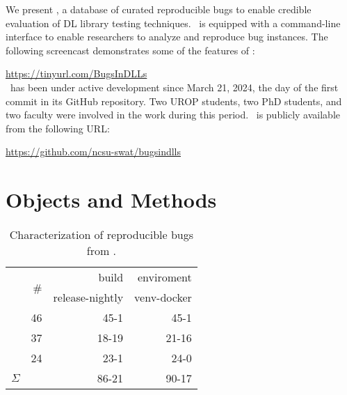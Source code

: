 \documentclass[sigconf,screen]{acmart}
\begin{document}
We present \tname, a database of curated reproducible bugs to
enable credible evaluation of DL library testing techniques. \tname\ is
equipped with a command-line interface to enable researchers to analyze
and reproduce bug instances. The following screencast demonstrates some
of the features of \tname:

\url{https://tinyurl.com/BugsInDLLs}\\

\tname\ has been under active development since March 21, 2024, the
day of the first commit in its GitHub repository. Two UROP students,
two PhD students, and two faculty were involved in the work during
this period. \tname\ is publicly available from the following URL:

\url{https://github.com/ncsu-swat/bugsindlls}


\section{Objects and Methods}

\begin{table}
  \centering
  \caption{\label{table:bug-characterization}Characterization of
    reproducible bugs from \tname.}
\begin{tabular}{l|rrr}
  \toprule & \multirow{2}{*}{\#} & \multicolumn{1}{r}{build} &
  \multicolumn{1}{r}{enviroment} \\ & & release-nightly & venv-docker
  \\ \cmidrule(lr){2-4} \jax{} & 46 & 45-1 & 45-1 \\ \torch{} & 37 &
  18-19 & 21-16 \\ \tf{} & 24 & 23-1 & 24-0 \\ \midrule
  \multicolumn{1}{c|}{$\Sigma$} & \numbugs{} & 86-21& 90-17
  \\ \bottomrule
\end{tabular}
\end{table}
\end{document}

